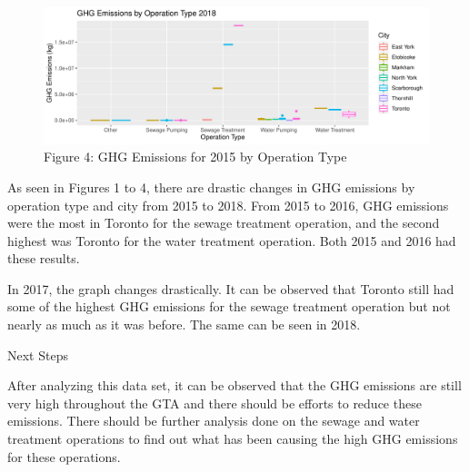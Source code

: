 \documentclass[
  letterpaper,
  DIV=11,
  numbers=noendperiod]{scrartcl}
\begin{document}
\begin{figure}

{\centering \includegraphics{paper_files/figure-pdf/unnamed-chunk-10-1.pdf}

}

\caption{Figure 4: GHG Emissions for 2015 by Operation Type}

\end{figure}

As seen in Figures 1 to 4, there are drastic changes in GHG emissions by
operation type and city from 2015 to 2018. From 2015 to 2016, GHG
emissions were the most in Toronto for the sewage treatment operation,
and the second highest was Toronto for the water treatment operation.
Both 2015 and 2016 had these results.

In 2017, the graph changes drastically. It can be observed that Toronto
still had some of the highest GHG emissions for the sewage treatment
operation but not nearly as much as it was before. The same can be seen
in 2018.

Next Steps

After analyzing this data set, it can be observed that the GHG emissions
are still very high throughout the GTA and there should be efforts to
reduce these emissions. There should be further analysis done on the
sewage and water treatment operations to find out what has been causing
the high GHG emissions for these operations.
\end{document}
